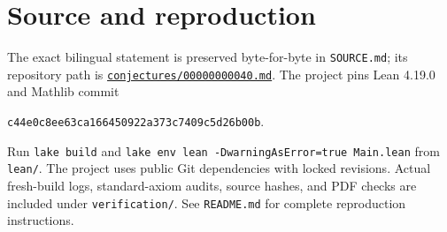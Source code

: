 \documentclass[11pt]{article}
\begin{document}
\section*{Source and reproduction}
The exact bilingual statement is preserved byte-for-byte in \texttt{SOURCE.md}; its repository path is
\href{https://github.com/The-Last-Math-Competition/The-Last-Math-Competition/blob/main/conjectures/00000000040.md}{\texttt{conjectures/00000000040.md}}.
The project pins Lean 4.19.0 and Mathlib commit
\begin{center}\small\texttt{c44e0c8ee63ca166450922a373c7409c5d26b00b}.\end{center}
Run \texttt{lake build} and \texttt{lake env lean -DwarningAsError=true Main.lean} from \texttt{lean/}. The project uses public Git dependencies with locked revisions. Actual fresh-build logs, standard-axiom audits, source hashes, and PDF checks are included under \texttt{verification/}. See \texttt{README.md} for complete reproduction instructions.
\end{document}
